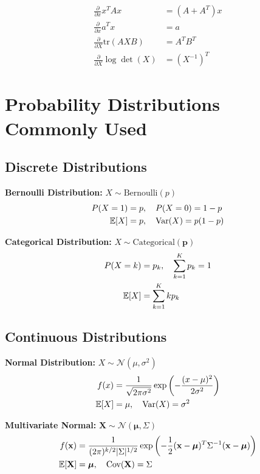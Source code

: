 \begin{align}
\frac{\partial}{\partial x} x^T A x &= (A + A^T) x \\
\frac{\partial}{\partial x} a^T x &= a \\
\frac{\partial}{\partial X} \text{tr}(AXB) &= A^T B^T \\
\frac{\partial}{\partial X} \log \det(X) &= (X^{-1})^T
\end{align}

\section{Probability Distributions Commonly Used}

\subsection{Discrete Distributions}

\textbf{Bernoulli Distribution:} $X \sim \text{Bernoulli}(p)$
\begin{align}
P(X = 1) &= p, \quad P(X = 0) = 1-p \\
\mathbb{E}[X] &= p, \quad \text{Var}(X) = p(1-p)
\end{align}

\textbf{Categorical Distribution:} $X \sim \text{Categorical}(\mathbf{p})$
\begin{align}
P(X = k) &= p_k, \quad \sum_{k=1}^K p_k = 1 \\
\mathbb{E}[X] &= \sum_{k=1}^K k p_k
\end{align}

\subsection{Continuous Distributions}

\textbf{Normal Distribution:} $X \sim \mathcal{N}(\mu, \sigma^2)$
\begin{align}
f(x) &= \frac{1}{\sqrt{2\pi\sigma^2}} \exp\left(-\frac{(x-\mu)^2}{2\sigma^2}\right) \\
\mathbb{E}[X] &= \mu, \quad \text{Var}(X) = \sigma^2
\end{align}

\textbf{Multivariate Normal:} $\mathbf{X} \sim \mathcal{N}(\boldsymbol{\mu}, \Sigma)$
\begin{align}
f(\mathbf{x}) &= \frac{1}{(2\pi)^{k/2}|\Sigma|^{1/2}} \exp\left(-\frac{1}{2}(\mathbf{x}-\boldsymbol{\mu})^T \Sigma^{-1} (\mathbf{x}-\boldsymbol{\mu})\right) \\
\mathbb{E}[\mathbf{X}] &= \boldsymbol{\mu}, \quad \text{Cov}(\mathbf{X}) = \Sigma
\end{align}

